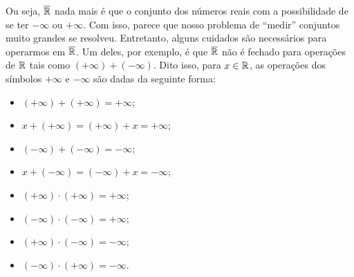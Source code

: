    Ou seja, $\operatorname{\overline{\mathbb{R}}}$ nada mais é que o conjunto dos números reais com a possibilidade de se ter $-\infty$ ou $+\infty$.
    Com isso, parece que nosso problema de \enquote{medir} conjuntos muito grandes se resolveu.
    Entretanto, alguns cuidados são necessários para operarmos em $\operatorname{\overline{\mathbb{R}}}$.
    Um deles, por exemplo, é que $\operatorname{\overline{\mathbb{R}}}$ não é fechado para operações de $\mathbb{R}$ tais como $(+\infty) + (-\infty)$.
    Dito isso, para $x \in \mathbb{R}$, as operações dos símbolos $+\infty$ e $-\infty$ são dadas da seguinte forma:
    \vspace{-0.4cm}
    \begin{multicols}{2}
        \begin{itemize}
            \item $(+ \infty) + (+ \infty)  = + \infty$;
            \item $x + (+ \infty) = (+ \infty) + x = + \infty$;
            \item $(- \infty) + (- \infty)  = - \infty$;
            \item $x + (- \infty) = (- \infty) + x = - \infty$;
            \item $(+ \infty)\cdot (+ \infty) =  +\infty $;
            \item $(- \infty)\cdot (- \infty) =  +\infty $;
            \item $(+ \infty)\cdot (- \infty) =  -\infty $;
            \item $(- \infty)\cdot (+ \infty) =  -\infty $.
        \end{itemize}
    \end{multicols}
	
